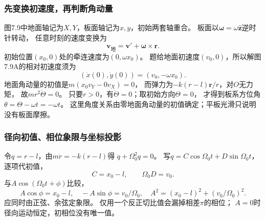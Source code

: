 \documentclass[UTF8,fontset=fandol,a4paper,11pt]{ctexart}
\begin{document}
\subsubsection*{先变换初速度，再判断角动量}
图7.9中地面轴记为$X,Y$，板面轴记为$x,y$，初始两套轴重合。
板面以$\boldsymbol\omega=\omega\hat{\boldsymbol z}$逆时针转动，
任意时刻的速度变换为
\[
\boldsymbol v_{\text{地}}=\boldsymbol v'
+\boldsymbol\omega\times\boldsymbol r.
\]
初始位置$(x_0,0)$处的牵连速度为$(0,\omega x_0)$。
题给地面初速度$(v_0,0)$，所以解图7.9A的相对初速度须为
\[
(\dot x(0),\dot y(0))=(v_0,-\omega x_0).
\]
地面角动量的初值是$m(x_0v_Y-0v_X)=0$，
而弹力为$-k(r-l)\boldsymbol r/r$，对$O$无力矩，
故$mr^2\dot\Theta=0$。
只要$r>0$，有$\dot\Theta=0$；取初始方向$\Theta=0$，
才得到板系方位角$\theta=\Theta-\omega t=-\omega t$。
这里角度关系由零地面角动量的初值确定；平板光滑只说明没有板面摩擦。

\subsubsection*{径向初值、相位象限与坐标投影}
令$q=r-l$，由$m\ddot r=-k(r-l)$得
$\ddot q+\Omega_0^2q=0$。
写$q=C\cos\Omega_0t+D\sin\Omega_0t$，逐项代初值，
\[
C=x_0-l,\qquad \Omega_0D=v_0.
\]
与$A\cos(\Omega_0t+\phi)$比较，
\[
A\cos\phi=x_0-l,\quad -A\sin\phi=v_0/\Omega_0,
\quad A^2=(x_0-l)^2+(v_0/\Omega_0)^2.
\]
应同时由正弦、余弦定象限。
仅用一个反正切比值会漏掉相差$\pi$的相位；
$A=0$时径向运动恒定，初相位没有唯一值。
\end{document}
